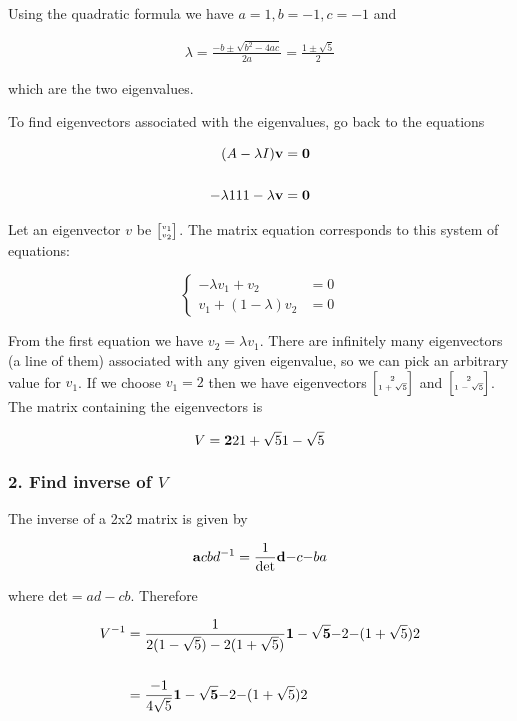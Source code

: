 Using the quadratic formula we have $a=1, b=-1, c=-1$ and

\begin{align*}
\lambda
= \frac{-b \pm \sqrt{b^2 - 4ac}}{2a}
= \frac{1 \pm \sqrt{5}}{2}
\end{align*}

which are the two eigenvalues.

To find eigenvectors associated with the eigenvalues, go back to the equations

\begin{align*}
(A - \lambda I)\mathbf v &= \mathbf 0
\\
\\
\mathbf{-\lambda}{1}
    {1       }{1 - \lambda} \mathbf v &= \mathbf 0
\end{align*}

Let an eigenvector $v$ be $\tiny{\begin{bmatrix}v_1\\v_2\end{bmatrix}}$. The matrix equation corresponds
to this system of equations:

$$
\begin{cases}
-\lambda v_1 + v_2               &= 0\\
v_1          + (1 - \lambda) v_2 &= 0
\end{cases}
$$

From the first equation we have $v_2 = \lambda v_1$. There are infinitely many
eigenvectors (a line of them) associated with any given eigenvalue, so we can
pick an arbitrary value for $v_1$. If we choose $v_1=2$ then we have
eigenvectors $\tiny{\begin{bmatrix}2\\1+\sqrt 5\end{bmatrix}}$ and $\tiny{\begin{bmatrix}2\\1-\sqrt 5\end{bmatrix}}$. The matrix
containing the eigenvectors is

$$
V = \mathbf{2          }{2          }
        {1 + \sqrt 5}{1 - \sqrt 5}
$$


\subsubsection{2. Find inverse of $V$}

The inverse of a 2x2 matrix is given by

$$
\mathbf{a}{c}
    {b}{d} ^ {-1}
=
\frac{1}{\text{det}} \mathbf{d}{-c}
                         {-b}{a}
$$

where $\text{det} = ad - cb$. Therefore

\begin{align*}
V^{-1}
&= \frac{1}{2(1 - \sqrt 5) - 2(1 + \sqrt 5)} \mathbf{1 - \sqrt 5 }{-2}
                                                 {-(1 + \sqrt 5)}{2}
\\\\
&= \frac{-1}{4\sqrt 5} \mathbf{1 - \sqrt 5 }{-2}
                           {-(1 + \sqrt 5)}{2}
\end{align*}


